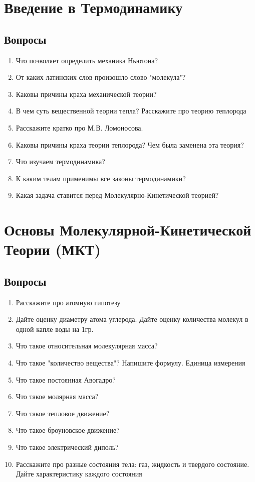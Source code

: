 \documentclass[12pt,a4paper]{report}
\begin{document}
\chapter{Введение в Термодинамику}
\section{Вопросы}
\begin{enumerate}
\item Что позволяет определить механика Ньютона?
\item От каких латинских слов произошло слово "молекула"?
\item Каковы причины краха механической теории?
\item В чем суть вещественной теории тепла? Расскажите про теорию теплорода
\item Расскажите кратко про М.В. Ломоносова.
\item Каковы причины краха теории теплорода? Чем была заменена эта теория?
\item Что изучаем термодинамика?
\item К каким телам применимы все законы термодинамики?
\item Какая задача ставится перед Молекулярно-Кинетической теорией?

\end{enumerate}

\chapter{Основы Молекулярной-Кинетической Теории (МКТ)}
\section{Вопросы}
\begin{enumerate}
\item Расскажите про атомную гипотезу
\item Дайте оценку диаметру атома углерода. Дайте оценку количества молекул в одной капле воды на 1гр.
\item Что такое относительная молекулярная масса?
\item Что такое "количество вещества"? Напишите формулу. Единица измерения
\item Что такое постоянная Авогадро?
\item Что такое молярная масса?
\item Что такое тепловое движение?
\item Что такое броуновское движение?
\item Что такое электрический диполь?
\item Расскажите про разные состояния тела: газ, жидкость и твердого состояние. Дайте характеристику каждого состояния
\end{enumerate}
\end{document}
